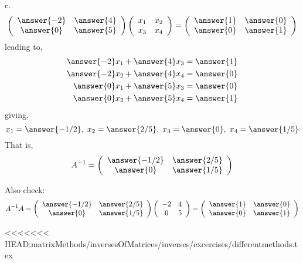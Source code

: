 \documentclass{ximera}
\begin{document}
\begin{exercise}
\begin{prompt}
c. \[
\left(\begin{array}{cc}
\answer{-2} & \answer{4}\\
\answer{0} & \answer{5}
\end{array}\right) \left(\begin{array}{cc}
x_{1} & x_{2}\\
x_{3} & x_{4}
\end{array}\right) = \left(\begin{array}{cc}
\answer{1} & \answer{0}\\
\answer{0} & \answer{1}
\end{array} \right)
\]
leading to,
\begin{eqnarray*}
\answer{-2}x_{1} + \answer{4}x_{3} = \answer{1}\\
\answer{-2}x_{2} + \answer{4}x_{4} = \answer{0}\\
\answer{0}x_{1} + \answer{5}x_{3} = \answer{0}\\
\answer{0}x_{2} + \answer{5}x_{4} = \answer{1}
\end{eqnarray*}
giving, \\
\begin{equation*}
x_{1} = \answer{-1/2}, \hspace{.1cm} x_{2} = \answer{2/5},\hspace{.1cm} x_{3} = \answer{0}, \hspace{.1cm} x_{4} = \answer{1/5}
\end{equation*}
That is,
\[
A^{-1} = \left(\begin{array}{cc}
\answer{-1/2} & \answer{2/5}\\
\answer{0} & \answer{1/5}
\end{array}\right)\]

Also check:
\[A^{-1}A = \left(\begin{array}{cc}
\answer{-1/2} & \answer{2/5}\\
\answer{0} & \answer{1/5}
\end{array}\right)\left(\begin{array}{cc}
-2 & 4\\
0& 5
\end{array}\right)= \left(\begin{array}{cc}
\answer{1} & \answer{0}\\
\answer{0} & \answer{1}
\end{array}\right)
\]




\end{prompt}
\end{exercise}




























<<<<<<< HEAD:matrixMethods/inversesOfMatrices/inverses/excercises/differentmethods.tex
\end{document}
